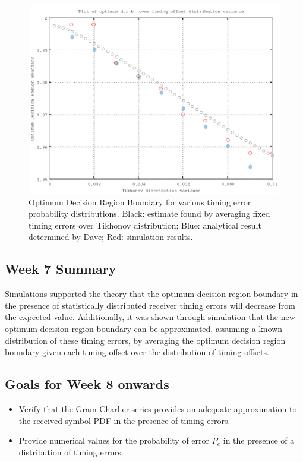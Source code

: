 \begin{figure}[htbp]
\centering
\includegraphics[width=\linewidth]{../../../plots/opt_dec_reg.png}
\caption{Optimum Decision Region Boundary for various timing error
probability distributions. Black: estimate found by averaging fixed timing errors over Tikhonov distribution; Blue: analytical result determined by Dave; Red: simulation results.}
\end{figure}

\subsection{Week 7 Summary}

Simulations supported the theory that the optimum decision region
boundary in the presence of statistically distributed receiver timing
errors will decrease from the expected value. Additionally, it was shown
through simulation that the new optimum decision region boundary can be
approximated, assuming a known distribution of these timing errors, by
averaging the optimum decision region boundary given each timing offset
over the distribution of timing offsets.

\subsection{Goals for Week 8 onwards}

\begin{itemize}
\itemsep1pt\parskip0pt
\item
  Verify that the Gram-Charlier series provides an adequate
  approximation to the received symbol PDF in the presence of timing
  errors.
\item
  Provide numerical values for the probability of error $P_e$ in the
  presence of a distribution of timing errors.
\end{itemize}

